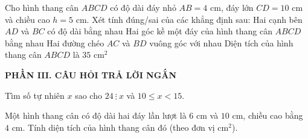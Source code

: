 \documentclass[12pt,a4paper]{article}
\begin{document}
\begin{ex}
Cho hình thang cân $ABCD$ có độ dài đáy nhỏ $AB = 4\text{ cm}$, đáy lớn $CD = 10\text{ cm}$ và chiều cao $h = 5\text{ cm}$. Xét tính đúng/sai của các khẳng định sau:
\choiceTF
{\True Hai cạnh bên $AD$ và $BC$ có độ dài bằng nhau}
{\True Hai góc kề một đáy của hình thang cân $ABCD$ bằng nhau}
{Hai đường chéo $AC$ và $BD$ vuông góc với nhau}
{\True Diện tích của hình thang cân $ABCD$ là $35\text{ cm}^2$}
\end{ex}


\setcounter{ex}{0}
\vspace{2mm}
\noindent\textbf{\large PHẦN III. CÂU HỎI TRẢ LỜI NGẮN}
\vspace{1mm}
\begin{ex}
Tìm số tự nhiên $x$ sao cho $24 \ \vdots \ x$ và $10 \le x < 15$. 
\end{ex}

\begin{ex}
Một hình thang cân có độ dài hai đáy lần lượt là $6\text{ cm}$ và $10\text{ cm}$, chiều cao bằng $4\text{ cm}$. Tính diện tích của hình thang cân đó (theo đơn vị $\text{cm}^2$). 
\end{ex}
\end{document}
